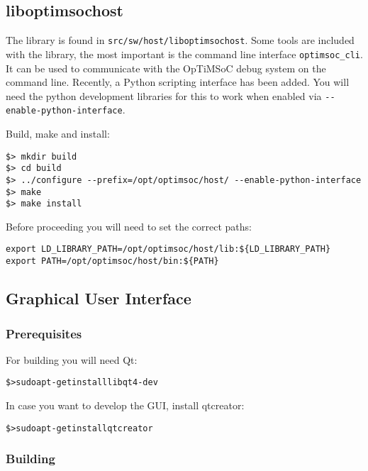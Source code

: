 \subsection{liboptimsochost}

The library is found in \verb|src/sw/host/liboptimsochost|.  Some
tools are included with the library, the most important is the command
line interface \verb|optimsoc_cli|. It can be used to communicate with
the OpTiMSoC debug system on the command line. Recently, a Python
scripting interface has been added. You will need the python
development libraries for this to work when enabled via
\verb|--enable-python-interface|.

Build, make and install:

\begin{verbatim}
$> mkdir build
$> cd build
$> ../configure --prefix=/opt/optimsoc/host/ --enable-python-interface
$> make
$> make install
\end{verbatim}

Before proceeding you will need to set the correct paths:

\begin{verbatim}
export LD_LIBRARY_PATH=/opt/optimsoc/host/lib:${LD_LIBRARY_PATH}
export PATH=/opt/optimsoc/host/bin:${PATH}
\end{verbatim}

\subsection{Graphical User Interface}

\subsubsection{Prerequisites}

For building you will need Qt:

\begin{alltt}
\$> sudo apt-get install libqt4-dev
\end{alltt}

In case you want to develop the GUI, install qtcreator:

\begin{alltt}
\$> sudo apt-get install qtcreator
\end{alltt}

\subsubsection{Building}

